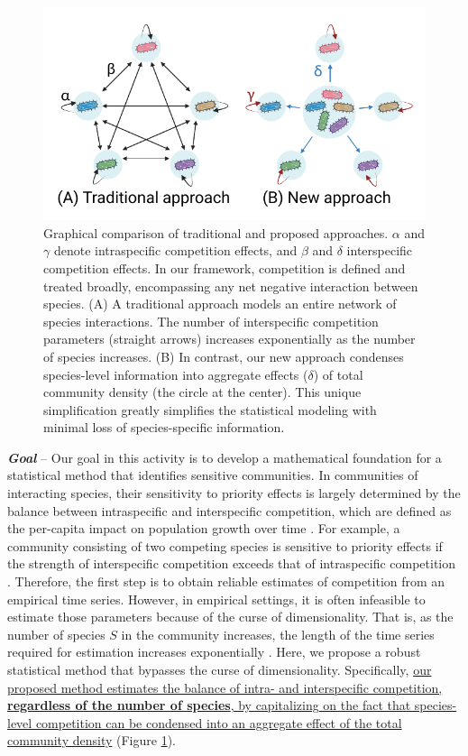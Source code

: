\documentclass[12pt, class=article, crop=false]{standalone}
\begin{document}
\begin{figure}
    \includegraphics[scale = 0.65]{output/figure_model.pdf}
    \caption{
    Graphical comparison of traditional and proposed approaches.
    $\alpha$ and $\gamma$ denote intraspecific competition effects, and $\beta$ and $\delta$ interspecific competition effects.
    In our framework, competition is defined and treated broadly, encompassing any net negative interaction between species.
    (A) A traditional approach models an entire network of species interactions.
    The number of interspecific competition parameters (straight arrows) increases exponentially as the number of species increases.
    (B) In contrast, our new approach condenses species-level information into aggregate effects ($\delta$) of total community density (the circle at the center).
    This unique simplification greatly simplifies the statistical modeling with minimal loss of species-specific information.
    }
    \label{fig:model_concept}
\end{figure}

\textbf{\textit{Goal}} -- 
Our goal in this activity is to develop a mathematical foundation for a statistical method that identifies sensitive communities.
In communities of interacting species, their sensitivity to priority effects is largely determined by the balance between intraspecific and interspecific competition, which are defined as the per-capita impact on population growth over time \citep{chesson_mechanisms_2000, barabas_chessons_2018, ke_coexistence_2018, terui_intentional_2023}.
For example, a community consisting of two competing species is sensitive to priority effects if the strength of interspecific competition exceeds that of intraspecific competition \citep{ke_coexistence_2018}.
Therefore, the first step is to obtain reliable estimates of competition from an empirical time series.
However, in empirical settings, it is often infeasible to estimate those parameters because of the curse of dimensionality. That is, as the number of species $S$ in the community increases, the length of the time series required for estimation increases exponentially \citep{ovaskainen_how_2017}.
Here, we propose a robust statistical method that bypasses the curse of dimensionality. Specifically, \ul{our proposed method estimates the balance of intra- and interspecific competition, \textbf{regardless of the number of species}, by capitalizing on the fact that species-level competition can be condensed into an aggregate effect of the total community density} (Figure \ref{fig:model_concept}).
\end{document}
